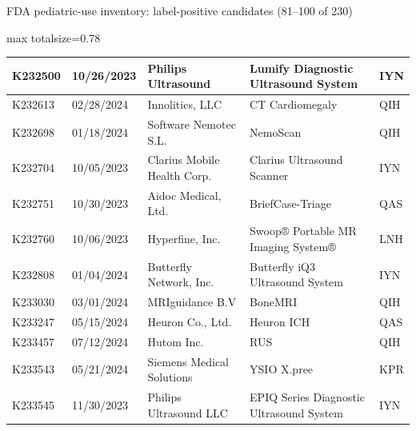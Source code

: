 \documentclass[aspectratio=169]{beamer}
\begin{document}
\begin{frame}[category=FDA appendix]{FDA pediatric-use inventory: label-positive candidates (81--100 of 230)}
\begin{adjustbox}{max totalsize={\textwidth}{0.78\textheight}}
\begin{tabular}{|p{}|p{}|p{}|p{}|p{}|}
K232500 & 10/26/2023 & Philips Ultrasound & Lumify Diagnostic Ultrasound System & IYN \\ \hline
K232613 & 02/28/2024 & Innolitics, LLC & CT Cardiomegaly & QIH \\ \hline
K232698 & 01/18/2024 & Software Nemotec S.L. & NemoScan & QIH \\ \hline
K232704 & 10/05/2023 & Clarius Mobile Health Corp. & Clarius Ultrasound Scanner & IYN \\ \hline
K232751 & 10/30/2023 & Aidoc Medical, Ltd. & BriefCase-Triage & QAS \\ \hline
K232760 & 10/06/2023 & Hyperfine, Inc. & Swoop® Portable MR Imaging System® & LNH \\ \hline
K232808 & 01/04/2024 & Butterfly Network, Inc. & Butterfly iQ3 Ultrasound System & IYN \\ \hline
K233030 & 03/01/2024 & MRIguidance B.V & BoneMRI & QIH \\ \hline
K233247 & 05/15/2024 & Heuron Co., Ltd. & Heuron ICH & QAS \\ \hline
K233457 & 07/12/2024 & Hutom Inc. & RUS & QIH \\ \hline
K233543 & 05/21/2024 & Siemens Medical Solutions & YSIO X.pree & KPR \\ \hline
K233545 & 11/30/2023 & Philips Ultrasound LLC & EPIQ Series Diagnostic Ultrasound System & IYN \\ \hline
\end{tabular}
\end{adjustbox}
\end{frame}
\end{document}

